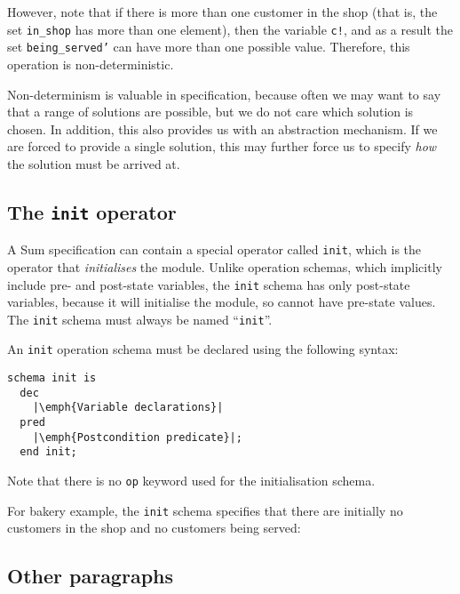 However, note that if there is more than one customer in the shop (that is, the set \texttt{in\_shop} has more than one element), then the variable \texttt{c!}, and as a result the set \texttt{being\_served'} can have more than one possible value. Therefore, this operation is non-deterministic.

Non-determinism is valuable in specification, because often we may want to say that a range of solutions are possible, but we do not care which solution is chosen. In addition, this also provides us with an abstraction mechanism. If we are forced to provide a single solution, this may further force us to specify \emph{how} the solution must be arrived at.

\subsection{The \texttt{init} operator}

A Sum specification can contain a special operator called \texttt{init}, which is the operator that \emph{initialises} the module. Unlike operation schemas, which implicitly include pre- and post-state variables, the \texttt{init} schema has only post-state variables, because it will initialise the module, so cannot have pre-state values. The \texttt{init} schema must always be named ``\texttt{init}''.

An \texttt{init} operation schema must be declared using the following syntax:
\lstset{aboveskip=3mm}
\begin{lstlisting}[escapeinside={||}]
  schema init is
  dec
    |\emph{Variable declarations}|
  pred
    |\emph{Postcondition predicate}|;
  end init;
\end{lstlisting}

Note that there is no \texttt{op} keyword used for the initialisation schema.

\begin{example}
For bakery example, the \texttt{init} schema specifies that there are initially no customers in the shop and no customers being served:



\end{example}

\subsection{Other paragraphs}

